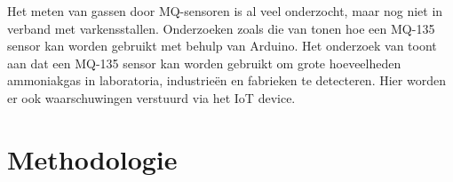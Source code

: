 Het meten van gassen door MQ-sensoren is al veel onderzocht, maar nog niet in verband met varkensstallen. Onderzoeken zoals die van \textcite{Gorakhpur2020} tonen hoe een MQ-135 sensor kan worden gebruikt met behulp van Arduino. Het onderzoek van \textcite{Vijayalakshmi2019} toont aan dat een MQ-135 sensor kan worden gebruikt om grote hoeveelheden ammoniakgas in laboratoria, industrieën en fabrieken te detecteren. Hier worden er ook waarschuwingen verstuurd via het IoT device. 




\section{Methodologie}%
\label{sec:methodologie}

\begin{comment}

Hier beschrijf je hoe je van plan bent het onderzoek te voeren. Welke onderzoekstechniek ga je toepassen om elk van je onderzoeksvragen te beantwoorden? Gebruik je hiervoor literatuurstudie, interviews met belanghebbenden (bv.~voor requirements-analyse), experimenten, simulaties, vergelijkende studie, risico-analyse, PoC, \ldots?

Valt je onderwerp onder één van de typische soorten bachelorproeven die besproken zijn in de lessen Research Methods (bv.\ vergelijkende studie of risico-analyse)? Zorg er dan ook voor dat we duidelijk de verschillende stappen terug vinden die we verwachten in dit soort onderzoek!

Vermijd onderzoekstechnieken die geen objectieve, meetbare resultaten kunnen opleveren. Enquêtes, bijvoorbeeld, zijn voor een bachelorproef informatica meestal \textbf{niet geschikt}. De antwoorden zijn eerder meningen dan feiten en in de praktijk blijkt het ook bijzonder moeilijk om voldoende respondenten te vinden. Studenten die een enquête willen voeren, hebben meestal ook geen goede definitie van de populatie, waardoor ook niet kan aangetoond worden dat eventuele resultaten representatief zijn.

Uit dit onderdeel moet duidelijk naar voor komen dat je bachelorproef ook technisch voldoen\-de diepgang zal bevatten. Het zou niet kloppen als een bachelorproef informatica ook door bv.\ een student marketing zou kunnen uitgevoerd worden.

Je beschrijft ook al welke tools (hardware, software, diensten, \ldots) je denkt hiervoor te gebruiken of te ontwikkelen.

Probeer ook een tijdschatting te maken. Hoe lang zal je met elke fase van je onderzoek bezig zijn en wat zijn de concrete \emph{deliverables} in elke fase?

\end{comment}


